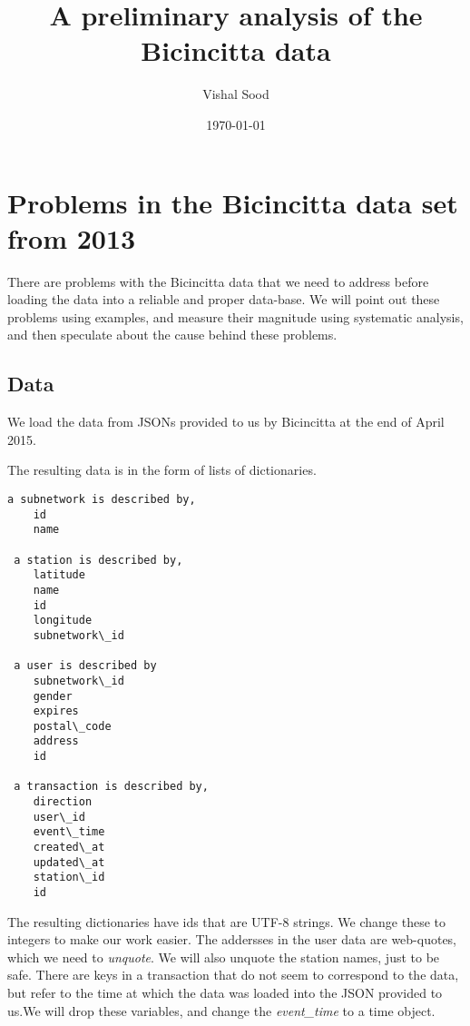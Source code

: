 \documentclass{report}
\title{A preliminary analysis of the Bicincitta data}
\author{Vishal Sood}
\date{\today}
\begin{document}
    
    
    
    \maketitle
    
    
    \tableofcontents


    
    \section{Problems in the Bicincitta data set from
2013}\label{problems-in-the-bicincitta-data-set-from-2013}

There are problems with the Bicincitta data that we need to address
before loading the data into a reliable and proper data-base. We will
point out these problems using examples, and measure their magnitude
using systematic analysis, and then speculate about the cause behind
these problems.

    \subsection{Data}\label{data}

We load the data from JSONs provided to us by Bicincitta at the end of
April 2015.


    The resulting data is in the form of lists of dictionaries.


    \begin{Verbatim}[commandchars=\\\{\}]
a subnetwork is described by, 
	id
	name

 a station is described by,
	latitude
	name
	id
	longitude
	subnetwork\_id

 a user is described by 
	subnetwork\_id
	gender
	expires
	postal\_code
	address
	id

 a transaction is described by, 
	direction
	user\_id
	event\_time
	created\_at
	updated\_at
	station\_id
	id
    \end{Verbatim}

    The resulting dictionaries have ids that are UTF-8 strings. We change
these to integers to make our work easier. The addersses in the user
data are web-quotes, which we need to \emph{unquote}. We will also
unquote the station names, just to be safe. There are keys in a
transaction that do not seem to correspond to the data, but refer to the
time at which the data was loaded into the JSON provided to us.We will
drop these variables, and change the \emph{event\_time} to a time
object.
\end{document}
